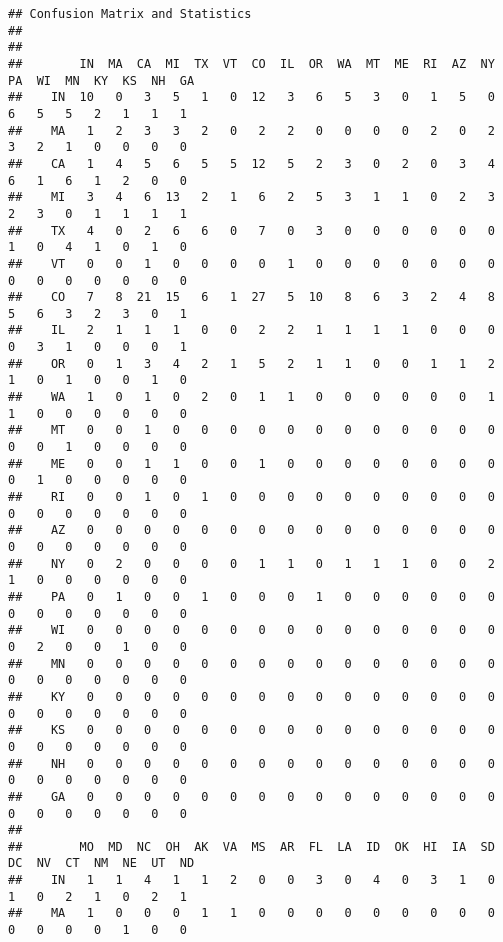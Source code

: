 \documentclass[
]{article}
\begin{document}
\begin{verbatim}
## Confusion Matrix and Statistics
## 
##      
##        IN  MA  CA  MI  TX  VT  CO  IL  OR  WA  MT  ME  RI  AZ  NY  PA  WI  MN  KY  KS  NH  GA
##    IN  10   0   3   5   1   0  12   3   6   5   3   0   1   5   0   6   5   5   2   1   1   1
##    MA   1   2   3   3   2   0   2   2   0   0   0   0   2   0   2   3   2   1   0   0   0   0
##    CA   1   4   5   6   5   5  12   5   2   3   0   2   0   3   4   6   1   6   1   2   0   0
##    MI   3   4   6  13   2   1   6   2   5   3   1   1   0   2   3   2   3   0   1   1   1   1
##    TX   4   0   2   6   6   0   7   0   3   0   0   0   0   0   0   1   0   4   1   0   1   0
##    VT   0   0   1   0   0   0   0   1   0   0   0   0   0   0   0   0   0   0   0   0   0   0
##    CO   7   8  21  15   6   1  27   5  10   8   6   3   2   4   8   5   6   3   2   3   0   1
##    IL   2   1   1   1   0   0   2   2   1   1   1   1   0   0   0   0   3   1   0   0   0   1
##    OR   0   1   3   4   2   1   5   2   1   1   0   0   1   1   2   1   0   1   0   0   1   0
##    WA   1   0   1   0   2   0   1   1   0   0   0   0   0   0   1   1   0   0   0   0   0   0
##    MT   0   0   1   0   0   0   0   0   0   0   0   0   0   0   0   0   0   1   0   0   0   0
##    ME   0   0   1   1   0   0   1   0   0   0   0   0   0   0   0   0   1   0   0   0   0   0
##    RI   0   0   1   0   1   0   0   0   0   0   0   0   0   0   0   0   0   0   0   0   0   0
##    AZ   0   0   0   0   0   0   0   0   0   0   0   0   0   0   0   0   0   0   0   0   0   0
##    NY   0   2   0   0   0   0   1   1   0   1   1   1   0   0   2   1   0   0   0   0   0   0
##    PA   0   1   0   0   1   0   0   0   1   0   0   0   0   0   0   0   0   0   0   0   0   0
##    WI   0   0   0   0   0   0   0   0   0   0   0   0   0   0   0   0   2   0   0   1   0   0
##    MN   0   0   0   0   0   0   0   0   0   0   0   0   0   0   0   0   0   0   0   0   0   0
##    KY   0   0   0   0   0   0   0   0   0   0   0   0   0   0   0   0   0   0   0   0   0   0
##    KS   0   0   0   0   0   0   0   0   0   0   0   0   0   0   0   0   0   0   0   0   0   0
##    NH   0   0   0   0   0   0   0   0   0   0   0   0   0   0   0   0   0   0   0   0   0   0
##    GA   0   0   0   0   0   0   0   0   0   0   0   0   0   0   0   0   0   0   0   0   0   0
##      
##        MO  MD  NC  OH  AK  VA  MS  AR  FL  LA  ID  OK  HI  IA  SD  DC  NV  CT  NM  NE  UT  ND
##    IN   1   1   4   1   1   2   0   0   3   0   4   0   3   1   0   1   0   2   1   0   2   1
##    MA   1   0   0   0   1   1   0   0   0   0   0   0   0   0   0   0   0   0   0   1   0   0

\end{verbatim}
\end{document}
